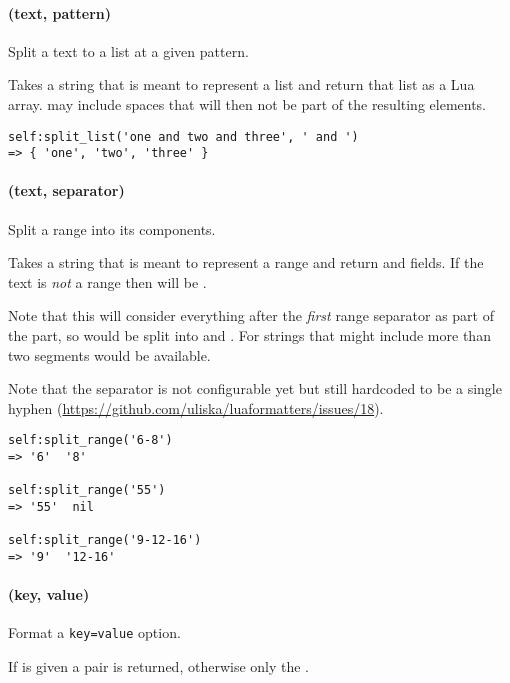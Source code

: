 \documentclass[12pt]{scrartcl}
\begin{document}
\paragraph{ (text, pattern)}

Split a text to a list at a given pattern.

\noindent Takes a string that is meant to represent a list and return that list as a Lua array.   may include spaces that will then not be part of the resulting elements.

\begin{verbatim}
self:split_list('one and two and three', ' and ')
=> { 'one', 'two', 'three' }
\end{verbatim}


\paragraph{ (text, separator)}

Split a range into its components.

\noindent Takes a string that is meant to represent a range and return
 and  fields.  If the text is \emph{not} a range then
 will be .

Note that this will consider everything after the \emph{first} range separator
as part of the  part, so  would be split into 
and . For strings that might include more than two segments
 would be available.

Note that the separator is not configurable yet but still hardcoded to be a
single hyphen (\url{https://github.com/uliska/luaformatters/issues/18}).

\begin{verbatim}
self:split_range('6-8')
=> '6'  '8'

self:split_range('55')
=> '55'  nil

self:split_range('9-12-16')
=> '9'  '12-16'
\end{verbatim}


\paragraph{ (key, value)}

Format a \texttt{key=value} option.

\noindent If  is given a \value{key=value} pair is returned,
otherwise only the .
\end{document}
